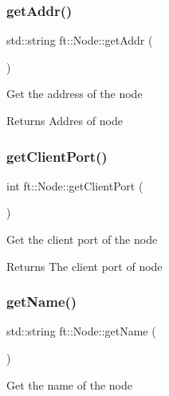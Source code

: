 \subsubsection{\texorpdfstring{get\+Addr()}{getAddr()}}
{\footnotesize\ttfamily std\+::string ft\+::\+Node\+::get\+Addr (\begin{DoxyParamCaption}{ }\end{DoxyParamCaption})\hspace{0.3cm}{\ttfamily [inline]}}

Get the address of the node

\begin{DoxyReturn}{Returns}
Addres of node 
\end{DoxyReturn}
\mbox{\label{classft_1_1Node_ad936b7c83c1169f04fe5c73ccca2a99d}} 
\subsubsection{\texorpdfstring{get\+Client\+Port()}{getClientPort()}}
{\footnotesize\ttfamily int ft\+::\+Node\+::get\+Client\+Port (\begin{DoxyParamCaption}{ }\end{DoxyParamCaption})\hspace{0.3cm}{\ttfamily [inline]}}

Get the client port of the node

\begin{DoxyReturn}{Returns}
The client port of node 
\end{DoxyReturn}
\mbox{\label{classft_1_1Node_af62312cc4d5a05c859034b10b1a1af64}} 
\subsubsection{\texorpdfstring{get\+Name()}{getName()}}
{\footnotesize\ttfamily std\+::string ft\+::\+Node\+::get\+Name (\begin{DoxyParamCaption}{ }\end{DoxyParamCaption})\hspace{0.3cm}{\ttfamily [inline]}}

Get the name of the node

